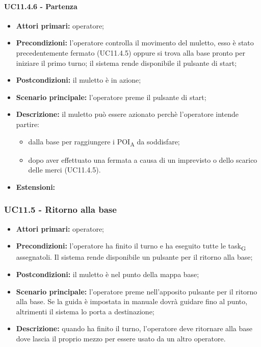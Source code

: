 \paragraph{UC11.4.6 - Partenza}
\begin{itemize}
	\item 	\textbf{Attori primari:} operatore;
	\item 	\textbf{Precondizioni:} l’operatore controlla il movimento del muletto, esso è stato precedentemente fermato (UC11.4.5) oppure si trova alla base pronto per iniziare il primo turno; il sistema rende disponibile il pulsante di start;
	\item 	\textbf{Postcondizioni:} il muletto è in azione;
	\item 	\textbf{Scenario principale:} l’operatore preme il pulsante di start;
	\item 	\textbf{Descrizione:} il muletto può essere azionato perchè l’operatore intende partire:
	\begin{itemize}
		\item dalla base per raggiungere i \acrshort{POI}\textsubscript{A} da soddisfare;
		\item dopo aver effettuato una fermata a causa di un imprevisto o dello scarico delle merci (UC11.4.5).
	\end{itemize}
	\item 	\textbf{Estensioni:}
\end{itemize}


\subsubsection{UC11.5 - Ritorno alla base}
\begin{itemize}
	\item 	\textbf{Attori primari:} operatore;
	\item 	\textbf{Precondizioni:} l’operatore ha finito il turno e ha eseguito tutte le \gls{task}\textsubscript{G} assegnatoli. Il sistema rende disponibile un pulsante per il ritorno alla base;
	\item 	\textbf{Postcondizioni:} il muletto è nel punto della mappa base;
	\item 	\textbf{Scenario principale:} l’operatore preme nell’apposito pulsante per il ritorno alla base. Se la guida è impostata in manuale dovrà guidare fino al punto, altrimenti il sistema lo porta a destinazione;
	\item 	\textbf{Descrizione:} quando ha finito il turno, l’operatore deve ritornare alla base dove lascia il proprio mezzo per essere usato da un altro operatore.
\end{itemize}

